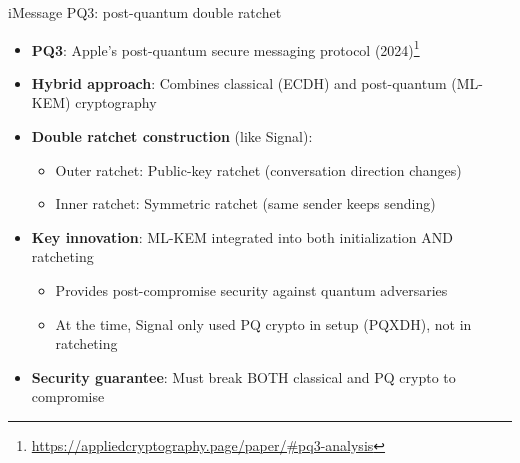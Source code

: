 \ifdefined\PRESENTATION\else\PassOptionsToClass{handout}{beamer}\fi\documentclass[aspectratio=169, lualatex]{beamer}
\begin{document}
\begin{frame}{iMessage PQ3: post-quantum double ratchet}
	\begin{itemize}
		\item \textbf{PQ3}: Apple's post-quantum secure messaging protocol (2024)\footnote{\url{https://appliedcryptography.page/paper/\#pq3-analysis}}
		\item \textbf{Hybrid approach}: Combines classical (ECDH) and post-quantum (ML-KEM) cryptography
		\item \textbf{Double ratchet construction} (like Signal):
		      \begin{itemize}
			      \item Outer ratchet: Public-key ratchet (conversation direction changes)
			      \item Inner ratchet: Symmetric ratchet (same sender keeps sending)
		      \end{itemize}
		\item \textbf{Key innovation}: ML-KEM integrated into both initialization AND ratcheting
		      \begin{itemize}
			      \item Provides post-compromise security against quantum adversaries
			      \item At the time, Signal only used PQ crypto in setup (PQXDH), not in ratcheting
		      \end{itemize}
		\item \textbf{Security guarantee}: Must break BOTH classical and PQ crypto to compromise
	\end{itemize}
\end{frame}
\end{document}
